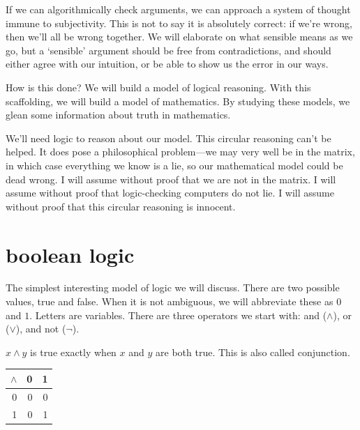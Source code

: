 \documentclass{scrbook}
\begin{document}
If we can algorithmically check arguments, we can approach a system of thought immune to subjectivity. This is not to say it is absolutely correct: if we're wrong, then we'll all be wrong together. We will elaborate on what sensible means as we go, but a `sensible' argument should be free from contradictions, and should either agree with our intuition, or be able to show us the error in our ways. 

How is this done? 
We will build a model of logical reasoning. With this scaffolding, we will build a model of mathematics. By studying these models, we glean some information about truth in mathematics. 


We'll need logic to reason about our model. This circular reasoning can't be helped. It does pose a philosophical problem---we may very well be in the matrix, in which case everything we know is a lie, so our mathematical model could be dead wrong. I will assume without proof that we are not in the matrix. I will assume without proof that logic-checking computers do not lie. I will assume without proof that this circular reasoning is innocent. 
\chapter[Boolean Logic]{boolean logic}
The simplest interesting model of logic we will discuss. There are two possible values, true and false. When it is not ambiguous, we will abbreviate these as $0$ and $1$. Letters are variables. There are three operators we start with: and ($\wedge$), or ($\vee$), and not ($\neg$). 
\begin{defn}
  \label{def:bool:and}
  $x \wedge y$ is true exactly when $x$ and $y$ are both true. This is also called conjunction.
  \begin{center}
    \begin{tabular}{r|rr}
      $\wedge$ & 0 & 1 \\
      \hline
      0 & 0 & 0 \\
      1 & 0 & 1 
    \end{tabular}
  \end{center}
\end{defn}
\end{document}
